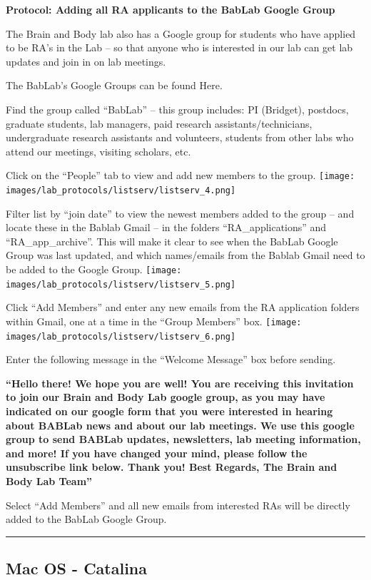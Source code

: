 \documentclass[
]{book}
\begin{document}
\textbf{Protocol: Adding all RA applicants to the BabLab Google Group}

The Brain and Body lab also has a Google group for students who have applied to be RA's in the Lab -- so that anyone who is interested in our lab can get lab updates and join in on lab meetings.

The BabLab's Google Groups can be found Here.

Find the group called ``BabLab'' -- this group includes: PI (Bridget), postdocs, graduate students, lab managers, paid research assistants/technicians, undergraduate research assistants and volunteers, students from other labs who attend our meetings, visiting scholars, etc.

Click on the ``People'' tab to view and add new members to the group.
\texttt{[image: images/lab\_protocols/listserv/listserv\_4.png]}

Filter list by ``join date'' to view the newest members added to the group -- and locate these in the Bablab Gmail -- in the folders ``RA\_applications'' and ``RA\_app\_archive''. This will make it clear to see when the BabLab Google Group was last updated, and which names/emails from the Bablab Gmail need to be added to the Google Group.
\texttt{[image: images/lab\_protocols/listserv/listserv\_5.png]}

Click ``Add Members'' and enter any new emails from the RA application folders within Gmail, one at a time in the ``Group Members'' box.
\texttt{[image: images/lab\_protocols/listserv/listserv\_6.png]}

Enter the following message in the ``Welcome Message'' box before sending.

\textbf{``Hello there!
We hope you are well! You are receiving this invitation to join our Brain and Body Lab google group, as you may have indicated on our google form that you were interested in hearing about BABLab news and about our lab meetings. We use this google group to send BABLab updates, newsletters, lab meeting information, and more! If you have changed your mind, please follow the unsubscribe link below. Thank you!
Best Regards,
The Brain and Body Lab Team''}

Select ``Add Members'' and all new emails from interested RAs will be directly added to the BabLab Google Group.

\begin{center}\rule{0.5\linewidth}{0.5pt}\end{center}

\hypertarget{mac-os---catalina}{%
\subsection{Mac OS - Catalina}\label{mac-os---catalina}}
\end{document}
